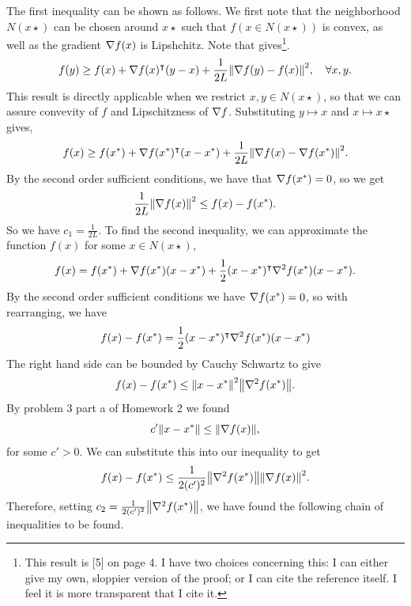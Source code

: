 \begin{solution}

    The first inequality can be shown as follows. We first note that the neighborhood $N(x\star)$ can be chosen around $x\star$ such that $f(x \in N(x\star))$ is convex, as well as the gradient $\nabla f(x)$ is Lipshchitz. Note that \cite{zhou2018fenchel} gives\footnote{This result is [5] on page 4. I have two choices concerning this: I can either give my own, sloppier version of the proof; or I can cite the reference itself. I feel it is more transparent that I cite it.}. 
    \[f(y) \geq f(x) + \nabla f(x)^\intercal (y - x) + \frac{1}{2L}\norm{\nabla f(y) - f(x)}^2, \quad \forall x, y.\]
    This result is directly applicable when we restrict $x, y \in N(x\star)$, so that we can assure convevity of $f$ and Lipschitzness of $\nabla f$. Substituting $y \mapsto x$ and $x \mapsto x\star$ gives,
    \[f(x) \geq f(x^{*}) + \nabla f(x^{*})^\intercal (x - x^{*}) + \frac{1}{2L}\norm{\nabla f(x) - \nabla f(x^{*})}^2.\]
    By the second order sufficient conditions, we have that $\nabla f(x^{*}) = 0$, so we get 
    \[\frac{1}{2L}\norm{\nabla f(x)}^2 \leq f(x) - f(x^{*}).\]
    So we have $c_1 = \frac{1}{2L}$. To find the second inequality, we can approximate the function $f(x)$ for some $x \in N(x\star)$, 
    \[f(x) = f(x^{*}) + \nabla f(x^{*})(x - x^{*}) + \frac{1}{2}(x - x^{*})^\intercal \nabla^2 f(x^{*})(x - x^{*}).\]
    By the second order sufficient conditions we have $\nabla f(x^{*}) = 0$, so with rearranging, we have
    \[f(x) - f(x^{*}) = \frac{1}{2}(x - x^{*})^\intercal \nabla^2 f(x^{*})(x - x^{*})\]
    The right hand side can be bounded by Cauchy Schwartz to give
    \[f(x) - f(x^{*}) \leq \norm{x - x^{*}}^2 \norm{\nabla^2f(x^{*})}.\]
    By problem 3 part a of Homework 2 we found 
    \[c'\norm{x - x^{*}} \leq \norm{\nabla f(x)},\]
    for some $c' > 0.$ We can substitute this into our inequality to get
    \[f(x) - f(x^{*}) \leq \frac{1}{2(c')^2} \norm{\nabla^2f(x^{*})}\norm{\nabla f(x)}^2.\]
    Therefore, setting $c_2 = \frac{1}{2(c')^2}\norm{\nabla^2 f(x^{*})}$, we have found the following chain of inequalities to be found.  
\end{solution}

\newpage
